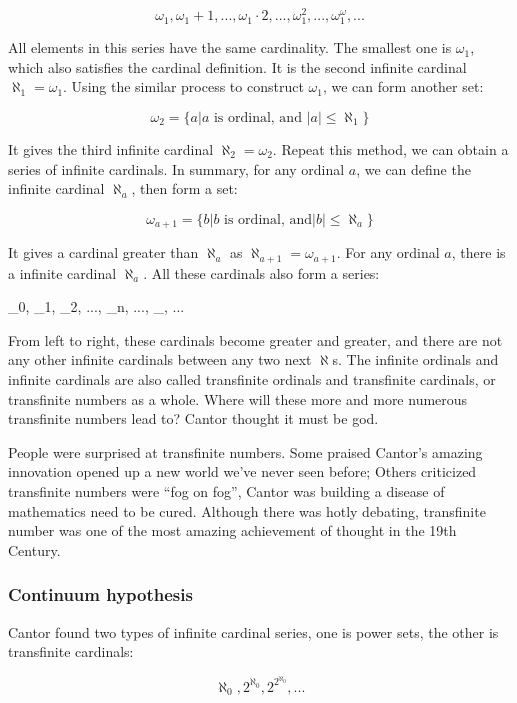 \documentclass{article}
\begin{document}
\[
\omega_1, \omega_1 + 1, ..., \omega_1 \cdot 2, ..., \omega_1^2, ..., \omega_1^\omega, ...
\]

All elements in this series have the same cardinality. The smallest one is $\omega_1$, which also satisfies the cardinal definition. It is the second infinite cardinal $\aleph_1 = \omega_1$. Using the similar process to construct $\omega_1$, we can form another set:

\[
\omega_2 = \{ a | a \text{ is ordinal, and } |a| \leq \aleph_1\}
\]

It gives the third infinite cardinal $\aleph_2 = \omega_2$. Repeat this method, we can obtain a series of infinite cardinals. In summary, for any ordinal $a$, we can define the infinite cardinal $\aleph_a$, then form a set:

\[
\omega_{a+1} = \{ b | b \text{ is ordinal, and} |b| \leq \aleph_a\}
\]

It gives a cardinal greater than $\aleph_a$ as $\aleph_{a+1} = \omega_{a+1}$. For any ordinal $a$, there is a infinite cardinal $\aleph_a$. All these cardinals also form a series:

\be
\aleph_0, \aleph_1, \aleph_2, ..., \aleph_n, ..., \aleph_{\omega}, ...
\ee

From left to right, these cardinals become greater and greater, and there are not any other infinite cardinals between any two next $\aleph$s. The infinite ordinals and infinite cardinals are also called transfinite ordinals and transfinite cardinals, or transfinite numbers as a whole. Where will these more and more numerous transfinite numbers lead to? Cantor thought it must be god.

People were surprised at transfinite numbers. Some praised Cantor's amazing innovation opened up a new world we've never seen before; Others criticized transfinite numbers were ``fog on fog'', Cantor was building a disease of mathematics need to be cured. Although there was hotly debating, transfinite number was one of the most amazing achievement of thought in the 19th Century.

\subsubsection{Continuum hypothesis}
  
Cantor found two types of infinite cardinal series, one is power sets, the other is transfinite cardinals:

\[
\aleph_0, 2^{\aleph_0}, 2^{2^{\aleph_0}}, ...
\]
\end{document}
